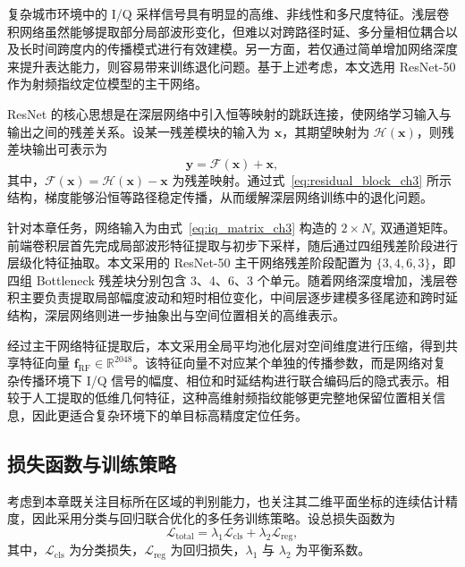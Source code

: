 复杂城市环境中的 I/Q 采样信号具有明显的高维、非线性和多尺度特征。浅层卷积网络虽然能够提取部分局部波形变化，但难以对跨路径时延、多分量相位耦合以及长时间跨度内的传播模式进行有效建模。另一方面，若仅通过简单增加网络深度来提升表达能力，则容易带来训练退化问题。基于上述考虑，本文选用 ResNet-50 作为射频指纹定位模型的主干网络。

ResNet 的核心思想是在深层网络中引入恒等映射的跳跃连接，使网络学习输入与输出之间的残差关系。设某一残差模块的输入为 \(\mathbf{x}\)，其期望映射为 \(\mathcal{H}(\mathbf{x})\)，则残差块输出可表示为
\begin{equation}
\mathbf{y}=\mathcal{F}(\mathbf{x})+\mathbf{x},
\label{eq:residual_block_ch3}
\end{equation}
其中，\(\mathcal{F}(\mathbf{x})=\mathcal{H}(\mathbf{x})-\mathbf{x}\) 为残差映射。通过式~\eqref{eq:residual_block_ch3} 所示结构，梯度能够沿恒等路径稳定传播，从而缓解深层网络训练中的退化问题。

针对本章任务，网络输入为由式~\eqref{eq:iq_matrix_ch3} 构造的 \(2\times N_s\) 双通道矩阵。前端卷积层首先完成局部波形特征提取与初步下采样，随后通过四组残差阶段进行层级化特征抽取。本文采用的 ResNet-50 主干网络残差阶段配置为 \(\{3,4,6,3\}\)，即四组 Bottleneck 残差块分别包含 3、4、6、3 个单元。随着网络深度增加，浅层卷积主要负责提取局部幅度波动和短时相位变化，中间层逐步建模多径尾迹和跨时延结构，深层网络则进一步抽象出与空间位置相关的高维表示。

经过主干网络特征提取后，本文采用全局平均池化层对空间维度进行压缩，得到共享特征向量 \(\mathbf{f}_{\mathrm{RF}}\in \mathbb{R}^{2048}\)。该特征向量不对应某个单独的传播参数，而是网络对复杂传播环境下 I/Q 信号的幅度、相位和时延结构进行联合编码后的隐式表示。相较于人工提取的低维几何特征，这种高维射频指纹能够更完整地保留位置相关信息，因此更适合复杂环境下的单目标高精度定位任务。

\subsection{损失函数与训练策略}
\label{subsec:3_3_2}

考虑到本章既关注目标所在区域的判别能力，也关注其二维平面坐标的连续估计精度，因此采用分类与回归联合优化的多任务训练策略。设总损失函数为
\begin{equation}
\mathcal{L}_{\mathrm{total}}=\lambda_1\mathcal{L}_{\mathrm{cls}}+\lambda_2\mathcal{L}_{\mathrm{reg}},
\label{eq:total_loss_ch3}
\end{equation}
其中，\(\mathcal{L}_{\mathrm{cls}}\) 为分类损失，\(\mathcal{L}_{\mathrm{reg}}\) 为回归损失，\(\lambda_1\) 与 \(\lambda_2\) 为平衡系数。


